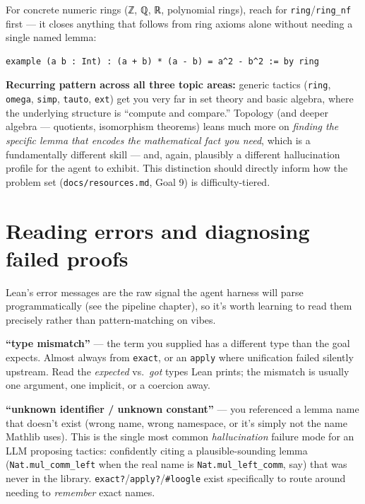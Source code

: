 For concrete numeric rings (ℤ, ℚ, ℝ, polynomial rings), reach for \texttt{ring}/\texttt{ring\_nf} first --- it closes anything that follows from ring axioms alone without needing a single named lemma:

\begin{verbatim}
example (a b : Int) : (a + b) * (a - b) = a^2 - b^2 := by ring
\end{verbatim}

\textbf{Recurring pattern across all three topic areas:} generic tactics (\texttt{ring}, \texttt{omega}, \texttt{simp}, \texttt{tauto}, \texttt{ext}) get you very far in set theory and basic algebra, where the underlying structure is ``compute and compare.'' Topology (and deeper algebra --- quotients, isomorphism theorems) leans much more on \emph{finding the specific lemma that encodes the mathematical fact you need}, which is a fundamentally different skill --- and, again, plausibly a different hallucination profile for the agent to exhibit. This distinction should directly inform how the problem set (\texttt{docs/resources.md}, Goal 9) is difficulty-tiered.

\section{Reading errors and diagnosing failed proofs}

Lean's error messages are the raw signal the agent harness will parse programmatically (see the pipeline chapter), so it's worth learning to read them precisely rather than pattern-matching on vibes.

\textbf{``type mismatch''} --- the term you supplied has a different type than the goal expects. Almost always from \texttt{exact}, or an \texttt{apply} where unification failed silently upstream. Read the \emph{expected} vs.\ \emph{got} types Lean prints; the mismatch is usually one argument, one implicit, or a coercion away.

\textbf{``unknown identifier / unknown constant''} --- you referenced a lemma name that doesn't exist (wrong name, wrong namespace, or it's simply not the name Mathlib uses). This is the single most common \emph{hallucination} failure mode for an LLM proposing tactics: confidently citing a plausible-sounding lemma (\texttt{Nat.mul\_comm\_left} when the real name is \texttt{Nat.mul\_left\_comm}, say) that was never in the library. \texttt{exact?}/\texttt{apply?}/\texttt{\#loogle} exist specifically to route around needing to \emph{remember} exact names.

